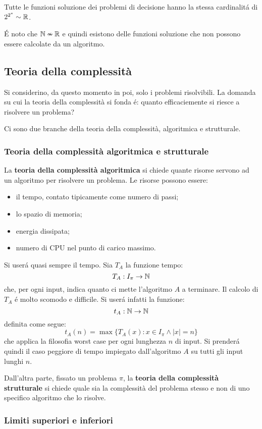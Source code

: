 Tutte le funzioni soluzione dei problemi di decisione hanno la stessa cardinalitá di $2^{2^*} \sim \mathbb{R}$.

É noto che $\mathbb{N} \nsim \mathbb{R}$ e quindi esistono delle funzioni soluzione che non possono essere calcolate da un algoritmo.

\subsection{Teoria della complessità}
Si considerino, da questo momento in poi, solo i problemi risolvibili. La domanda su cui la teoria della complessità si fonda é: quanto efficaciemente si riesce a risolvere un problema?

Ci sono due branche della teoria della complessità, algoritmica e strutturale.

\subsubsection{Teoria della complessità algoritmica e strutturale}
La \textbf{teoria della complessità algoritmica} si chiede quante risorse servono ad un algoritmo per risolvere un problema.
Le risorse possono essere:
\begin{itemize}
    \item il tempo, contato tipicamente come numero di passi;
    \item lo spazio di memoria;
    \item energia dissipata;
    \item numero di CPU nel punto di carico massimo.
\end{itemize}

\noindent
Si userá quasi sempre il tempo. Sia $T_A$ la funzione tempo:
$$ T_A:I_\pi \rightarrow \mathbb{N} $$
che, per ogni input, indica quanto ci mette l'algoritmo $A$ a terminare. Il calcolo di $T_A$ é molto scomodo e difficile. Si userá infatti la funzione:
$$ t_A:\mathbb{N} \rightarrow \mathbb{N} $$
definita come segue: 
$$ t_A(n) = \max\{T_A(x) : x\in I_\pi \wedge |x|=n\} $$
che applica la filosofia worst case per ogni lunghezza $n$ di input. Si prenderá quindi il caso peggiore di tempo impiegato dall'algoritmo $A$ su tutti gli input lunghi $n$.


Dall'altra parte, fissato un problema $\pi$, la \textbf{teoria della complessità strutturale} si chiede quale sia la complessità del problema stesso e non di uno specifico algoritmo che lo risolve.

\subsubsection{Limiti superiori e inferiori}

